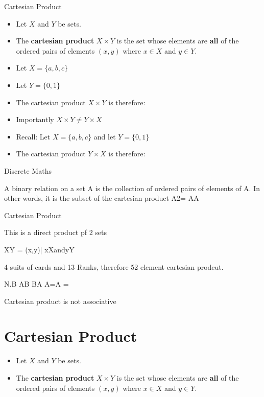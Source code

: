 \documentclass[12pt]{article}
\begin{document}
{Cartesian Product}
{
\begin{itemize}
\item Let $X$ and $Y$ be sets.
\item The \textbf{cartesian product} $X \times Y$ is the set whose elements are \textbf{all} of the ordered pairs of elements $(x,y)$ where $x \in X$ and $y \in Y$.
\end{itemize}

\begin{itemize}
\item Let $X = \{a,b,c\}$
\item Let $Y = \{0,1\}$ 
\item The cartesian product $X \times Y$ is therefore:
\end{itemize}

\begin{itemize}
\item Importantly $X \times Y \neq Y \times X$
\item Recall: Let $X = \{a,b,c\}$ and let $Y = \{0,1\}$ 
\item The cartesian product $Y \times X$ is therefore:
\end{itemize}
}

Discrete Maths

A binary relation on a set A is the collection of ordered pairs of elements of A. In other words, it is the subset of the cartesian product A2= AA

Cartesian Product

This is a direct product pf 2 sets

XY = {(x,y)| xXandyY }

4 suits of cards and 13 Ranks, therefore 52 element cartesian prodcut.

N.B         AB BA
A=A =

Cartesian product is not associative

\section{Cartesian Product}

\begin{itemize}
\item Let $X$ and $Y$ be sets.
\item The \textbf{cartesian product} $X \times Y$ is the set whose elements are \textbf{all} of 
the ordered pairs of elements $(x,y)$ where $x \in X$ and $y \in Y$.
\end{itemize}
\end{document}
